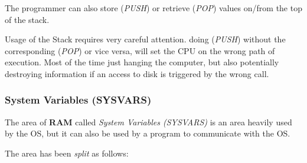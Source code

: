 \documentclass[a4paper,11pt]{article}
\begin{document}
    The programmer can also store (\textit{PUSH}) or retrieve (\textit{POP})
    values on/from the top of the stack.

    Usage of the Stack requires very careful attention. doing (\textit{PUSH})
    without the corresponding (\textit{POP}) or vice versa, will set the CPU on
    the wrong path of execution. Most of the time just hanging the computer, but
    also potentially destroying information if an access to disk is triggered by
    the wrong call.

    \subsubsection{System Variables (SYSVARS)}
    \label{sec:ram_memmap}

    The area of \textbf{RAM} called \textit{System Variables (SYSVARS)} is an 
    area heavily used by the OS, but it can also be used by a program to
    communicate with the OS.

    The area has been \textit{split} as follows:
\end{document}
